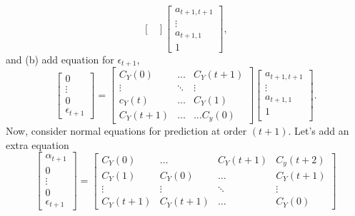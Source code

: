 \documentclass[11pt,english]{article}
\begin{document}
{\begin{equation}
\begin{bmatrix}
\end{bmatrix}
\begin{bmatrix}
a_{t+1,t+1}\\
\vdots\\
a_{t+1,1}\\
1
\end{bmatrix},
\end{equation}
and (b) add equation for $\epsilon_{t+1}$,
\begin{equation}\label{eqn:eq0}
\begin{bmatrix}
0\\
\vdots\\
0 \\
\epsilon_{t+1}
\end{bmatrix} = 
\begin{bmatrix}
C_Y(0) &\ldots &C_Y(t+1)\\
\vdots &\ddots &\vdots\\
c_Y(t) &\ldots &C_Y(1)\\
C_Y(t+1) &\ldots &\ldots C_y(0)

\end{bmatrix}
\begin{bmatrix}
a_{t+1,t+1}\\
\vdots\\
a_{t+1,1}\\
1\\
\end{bmatrix}.
\end{equation}
Now, consider normal equations for prediction at order $(t+1)$. Let's add an extra equation
\begin{equation}\label{eqn:eq1}
\begin{bmatrix}
\alpha_{t+1}\\
0\\
\vdots\\
0 \\
\epsilon_{t+1}
\end{bmatrix} = 
\begin{bmatrix}
C_Y(0) &\ldots &C_Y(t+1) &C_y(t+2)\\
C_Y(1) &C_Y(0) &\ldots &C_Y(t+1)\\
\vdots &\vdots &\ddots &\vdots\\
C_Y(t+1) &C_Y(t+1) &\ldots &C_Y(0)



\end{bmatrix}
\end{equation}}
\end{document}
